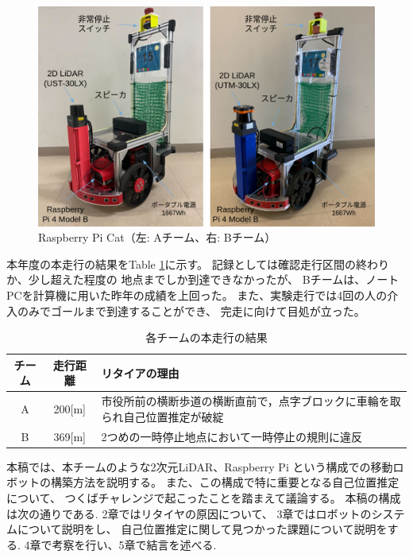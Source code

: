 \documentclass[twocolumn,9pt]{jsproceedings}
\begin{document}
\begin{figure}[h]
 	\begin{center}
 		\includegraphics[width=1.0\linewidth]{figs/raspicat.pdf}
 		\caption{Raspberry Pi Cat（左: Aチーム、右: Bチーム）}
 		\label{fig:raspicat}
 	\end{center}
\end{figure}

本年度の本走行の結果をTable \ref{MainRun}に示す。
記録としては確認走行区間の終わりか、少し超えた程度の
地点までしか到達できなかったが、
Bチームは、ノートPCを計算機に用いた昨年の成績を上回った。
また、実験走行では4回の人の介入のみでゴールまで到達することができ、
完走に向けて目処が立った。

\begin{table}[h]
  \caption{各チームの本走行の結果}
  \label{MainRun}
	\begin{tabular}{|c|c|p{5.4cm}|}
    \hline
	チーム & 走行距離 & リタイアの理由 \\
    \hline
	A & 200[m] & 市役所前の横断歩道の横断直前で，点字ブロックに車輪を取られ自己位置推定が破綻\\
    \hline
	B & 369[m] & 2つめの一時停止地点において一時停止の規則に違反 \\ 
    \hline
  \end{tabular}
\end{table}


本稿では、本チームのような2次元LiDAR、Raspberry Pi
という構成での移動ロボットの構築方法を説明する。
また、この構成で特に重要となる自己位置推定について、
つくばチャレンジで起こったことを踏まえて議論する。
本稿の構成は次の通りである. 
2章ではリタイヤの原因について、
3章ではロボットのシステムについて説明をし、
自己位置推定に関して見つかった課題について説明をする. 
4章で考察を行い、5章で結言を述べる. 
\end{document}
